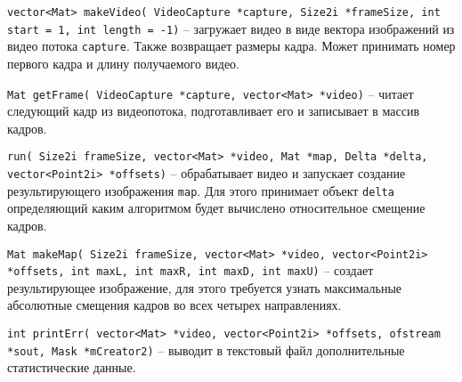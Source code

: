 \texttt{vector<Mat> makeVideo( VideoCapture *capture, Size2i *frameSize, int start = 1, int length = -1)} -- загружает видео в виде вектора изображений из видео потока \texttt{capture}. Также возвращает размеры кадра. Может принимать номер первого кадра и длину получаемого видео. 

\texttt{Mat getFrame( VideoCapture *capture, vector<Mat> *video)} -- читает следующий кадр из видеопотока, подготавливает его и записывает в массив кадров.

\texttt{run( Size2i frameSize, vector<Mat> *video, Mat *map, Delta *delta,
    vector<Point2i> *offsets)} -- обрабатывает видео и запускает создание результирующего изображения \texttt{map}. Для этого принимает объект \texttt{delta} определяющий каким алгоритмом будет вычислено относительное смещение кадров.

\texttt{Mat makeMap( Size2i frameSize, vector<Mat> *video, vector<Point2i> *offsets,
    int maxL, int maxR, int maxD, int maxU)} -- создает результирующее изображение, для этого требуется узнать максимальные абсолютные смещения кадров во всех четырех направлениях.

\texttt{int printErr( vector<Mat> *video, vector<Point2i> *offsets, ofstream *sout, Mask *mCreator2)} -- выводит в текстовый файл дополнительные статистические данные.

